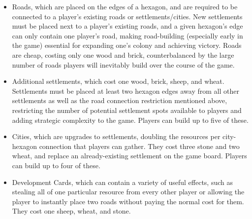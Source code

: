 \documentclass[a4paper, 11pt]{article}
\begin{document}
\begin{itemize}
	\item Roads, which are placed on the edges of a hexagon, and are required to be connected to a player's existing roads or settlements/cities. New settlements must be placed next to a player's existing roads, and a given hexagon's edge can only contain one player's road, making road-building (especially early in the game) essential for expanding one's colony and achieving victory. Roads are cheap, costing only one wood and brick, counterbalanced by the large number of roads players will inevitably build over the course of the game.
	\item Additional settlements, which cost one wood, brick, sheep, and wheat. Settlements must be placed at least two hexagon edges away from all other settlements as well as the road connection restriction mentioned above, restricting the number of potential settlement spots available to players and adding strategic complexity to the game. Players can build up to five of these.
	\item Cities, which are upgrades to settlements, doubling the resources per city-hexagon connection that players can gather. They cost three stone and two wheat, and replace an already-existing settlement on the game board. Players can build up to four of these.
	\item Development Cards, which can contain a variety of useful effects, such as stealing all of one particular resource from every other player or allowing the player to instantly place two roads without paying the normal cost for them. They cost one sheep, wheat, and stone.
\end{itemize}
\end{document}
